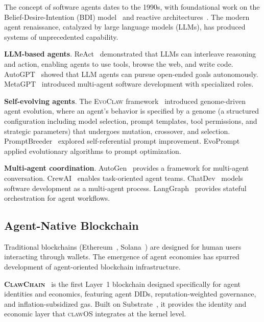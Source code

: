 \documentclass{article}
\newcommand{\clawos}{\textsc{clawOS}}
\newcommand{\evoclaw}{\textsc{EvoClaw}}
\newcommand{\clawchain}{\textsc{ClawChain}}
\begin{document}
The concept of software agents dates to the 1990s, with foundational work on the Belief-Desire-Intention (BDI) model~\cite{rao1995bdi} and reactive architectures~\cite{brooks1991intelligence}. The modern agent renaissance, catalyzed by large language models (LLMs), has produced systems of unprecedented capability.

\textbf{LLM-based agents}. ReAct~\cite{yao2023react} demonstrated that LLMs can interleave reasoning and action, enabling agents to use tools, browse the web, and write code. AutoGPT~\cite{yang2023autogpt} showed that LLM agents can pursue open-ended goals autonomously. MetaGPT~\cite{hong2024metagpt} introduced multi-agent software development with specialized roles.

\textbf{Self-evolving agents}. The \evoclaw{} framework~\cite{chen2026evoclaw} introduced genome-driven agent evolution, where an agent's behavior is specified by a genome (a structured configuration including model selection, prompt templates, tool permissions, and strategic parameters) that undergoes mutation, crossover, and selection. PromptBreeder~\cite{fernando2023promptbreeder} explored self-referential prompt improvement. EvoPrompt~\cite{guo2024evoprompt} applied evolutionary algorithms to prompt optimization.

\textbf{Multi-agent coordination}. AutoGen~\cite{wu2023autogen} provides a framework for multi-agent conversation. CrewAI~\cite{crewai2024} enables task-oriented agent teams. ChatDev~\cite{qian2024chatdev} models software development as a multi-agent process. LangGraph~\cite{langgraph2024} provides stateful orchestration for agent workflows.

\subsection{Agent-Native Blockchain}

Traditional blockchains (Ethereum~\cite{buterin2014ethereum}, Solana~\cite{yakovenko2018solana}) are designed for human users interacting through wallets. The emergence of agent economies has spurred development of agent-oriented blockchain infrastructure.

\textbf{\clawchain{}}~\cite{chen2026clawchain} is the first Layer~1 blockchain designed specifically for agent identities and economics, featuring agent DIDs, reputation-weighted governance, and inflation-subsidized gas. Built on Substrate~\cite{parity2024substrate}, it provides the identity and economic layer that \clawos{} integrates at the kernel level.
\end{document}
